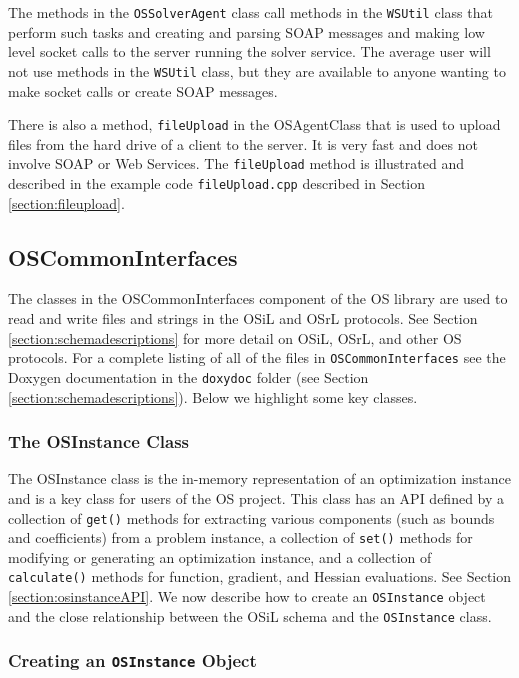 \documentclass[11pt]{article}
\renewcommand{\_}{{\char"5F}}
\renewcommand{\{}{{\char"7B}}
\renewcommand{\}}{{\char"7D}}
\renewcommand{\^}{{\char"0D}}
\renewcommand{\'}{{\char"0D}}
\begin{document}
The methods in the {\tt OSSolverAgent} class call methods in the {\tt WSUtil} class that perform such tasks and creating and parsing SOAP messages and making low level socket calls to the server running the solver service. The average user will not use methods in the {\tt WSUtil} class, but they are available to anyone wanting to make socket calls or create SOAP messages. 

There is also a method, {\tt fileUpload} in the OSAgentClass that is used to upload files from the hard drive of a client to the server. It is very fast and does not involve SOAP or Web Services. The {\tt fileUpload}  method is illustrated and described in the example code {\tt fileUpload.cpp} described in Section \ref{section:fileupload}.

\subsection{OSCommonInterfaces}

The classes in the OSCommonInterfaces component of the OS library are  used  to read and write files and strings in the OSiL and OSrL protocols. See Section \ref{section:schemadescriptions} for more detail on OSiL, OSrL, and other OS protocols. For a complete listing of all of the files in {\tt OSCommonInterfaces} see the Doxygen documentation in the {\tt doxydoc} folder (see Section \ref{section:schemadescriptions}).  Below we highlight some key classes.





\subsubsection{The OSInstance Class}\label{section:osinstanceclass}

The OSInstance class is the in-memory representation of an optimization instance and is a key class for users of the OS project. This class has an API defined by a collection of {\tt get()} methods for extracting various components (such as bounds and coefficients) from a problem instance, a collection of {\tt set()} methods for modifying or generating an optimization instance, and a collection of {\tt calculate()} methods for function, gradient, and Hessian evaluations.  See Section \ref{section:osinstanceAPI}.  We now describe how to create an {\tt OSInstance} object and the close relationship between the OSiL schema and the {\tt OSInstance} class. 

\subsubsection{Creating an {\tt OSInstance} Object}
\end{document}
